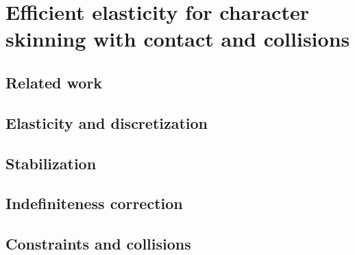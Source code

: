 

\newtheorem{lemma}{Lemma}


\chapter{Efficient elasticity for character skinning with contact and collisions}\label{chap:elasticity}
%


\section{Related work}
\label{sec:relatedwork}


\section{Elasticity and discretization}
\label{sec:elasticity}


\section{Stabilization}
\label{sec:stabilization}


\section{Indefiniteness correction}
\label{sec:indefiniteness}


\section{Constraints and collisions}
\label{sec:constraints}


